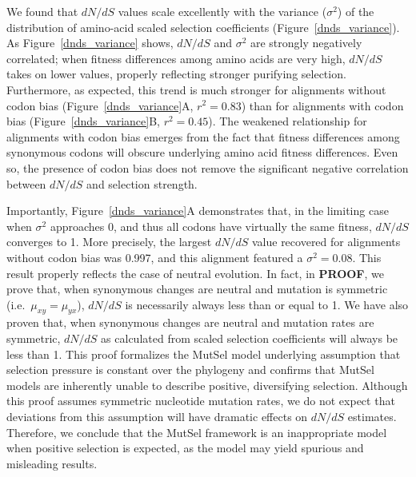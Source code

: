 \documentclass{pnastwo}
\begin{document}
\begin{article}
We found that $dN/dS$ values scale excellently with the variance ($\sigma^2$) of the distribution of amino-acid scaled selection coefficients (Figure~\ref{dnds_variance}). As Figure~\ref{dnds_variance} shows, $dN/dS$ and $\sigma^2$ are strongly negatively correlated; when fitness differences among amino acids are very high, $dN/dS$ takes on lower values, properly reflecting stronger purifying selection. Furthermore, as expected, this trend is much stronger for alignments without codon bias (Figure~\ref{dnds_variance}A, $r^2 = 0.83$) than for alignments with codon bias (Figure~\ref{dnds_variance}B, $r^2 = 0.45$). The weakened relationship for alignments with codon bias emerges from the fact that fitness differences among synonymous codons will obscure underlying amino acid fitness differences. Even so, the presence of codon bias does not remove the significant negative correlation between $dN/dS$ and selection strength.
		
Importantly, Figure~\ref{dnds_variance}A demonstrates that, in the limiting case when $\sigma^2$ approaches 0, and thus all codons have virtually the same fitness, $dN/dS$ converges to 1. More precisely, the largest $dN/dS$ value recovered for alignments without codon bias was 0.997, and this alignment featured a $\sigma^2 = 0.08$. This result properly reflects the case of neutral evolution. In fact, in \textbf{PROOF}, we prove that, when synonymous changes are neutral and mutation is symmetric (i.e.\ $\mu_{xy} = \mu_{yx}$), $dN/dS$ is necessarily always less than or equal to 1. We have also proven that, when synonymous changes are neutral and mutation rates are symmetric, $dN/dS$ as calculated from scaled selection coefficients will always be less than 1. This proof formalizes the MutSel model underlying assumption that selection pressure is constant over the phylogeny and confirms that MutSel models are inherently unable to describe positive, diversifying selection. Although this proof assumes symmetric nucleotide mutation rates, we do not expect that deviations from this assumption will have dramatic effects on $dN/dS$ estimates. Therefore, we conclude that the MutSel framework is an inappropriate model when positive selection is expected, as the model may yield spurious and misleading results. 


\end{article}
\end{document}
